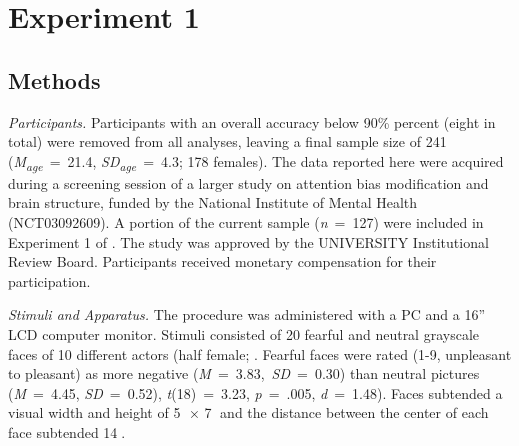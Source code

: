 \documentclass[issue,header,twocolumn,empirical, authordate,10pt]{jote-new-article}
\begin{document}
\section{Experiment 1}

\subsection{Methods}

\emph{Participants. }Participants with an overall accuracy below 90\% percent (eight in total) were removed from all analyses, leaving a final sample size of 241 (\emph{M}\textsubscript{\emph{age}}~=~21.4, \emph{SD}\textsubscript{\emph{age}}~=~4.3; 178 females). The data reported here were acquired during a screening session of a larger study on attention bias modification and brain structure, funded by the National Institute of Mental Health (NCT03092609). A portion of the current sample (\emph{n}~=~127) were included in Experiment 1 of \parencite{Carlson2020}. The study was approved by the UNIVERSITY Institutional Review Board. Participants received monetary compensation for their participation.

\emph{Stimuli and Apparatus. }The procedure was administered with a PC and a 16” LCD computer monitor. Stimuli consisted of 20 fearful and neutral grayscale faces of 10 different actors (half female; \parencite{Gur2002, Lundqvist1998}. Fearful faces were rated (1-9, unpleasant to pleasant) as more negative (\emph{M}~=~3.83,~\emph{SD}~=~0.30) than neutral pictures (\emph{M}~=~4.45, \emph{SD}~=~0.52), \emph{t}(18)~=~3.23, \emph{p}~=~.005, \emph{d}~=~1.48). Faces subtended a visual width and height of 5 × 7 and the distance between the center of each face subtended 14.
\end{document}
